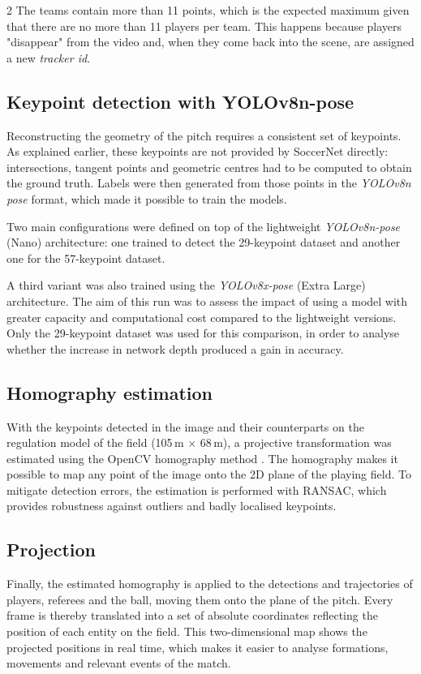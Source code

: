 \begin{multicols}{2}
The teams contain more than 11 points, which is the expected maximum given that there are no more than 11 players per team. This happens because players "disappear" from the video and, when they come back into the scene, are assigned a new \textit{tracker id}.

\subsection{Keypoint detection with YOLOv8n-pose}
Reconstructing the geometry of the pitch requires a consistent set of keypoints. As explained earlier, these keypoints are not provided by SoccerNet directly: intersections, tangent points and geometric centres had to be computed to obtain the ground truth. Labels were then generated from those points in the \emph{YOLOv8n pose} format, which made it possible to train the models.

Two main configurations were defined on top of the lightweight \emph{YOLOv8n-pose} (Nano) architecture: one trained to detect the 29-keypoint dataset and another one for the 57-keypoint dataset.

A third variant was also trained using the \emph{YOLOv8x-pose} (Extra Large) architecture. The aim of this run was to assess the impact of using a model with greater capacity and computational cost compared to the lightweight versions. Only the 29-keypoint dataset was used for this comparison, in order to analyse whether the increase in network depth produced a gain in accuracy.

\subsection{Homography estimation}
With the keypoints detected in the image and their counterparts on the regulation model of the field (105\,m $\times$ 68\,m), a projective transformation was estimated using the OpenCV homography method \cite{opencv}. The homography makes it possible to map any point of the image onto the 2D plane of the playing field. To mitigate detection errors, the estimation is performed with RANSAC, which provides robustness against outliers and badly localised keypoints.

\subsection{Projection}
Finally, the estimated homography is applied to the detections and trajectories of players, referees and the ball, moving them onto the plane of the pitch. Every frame is thereby translated into a set of absolute coordinates reflecting the position of each entity on the field. This two-dimensional map shows the projected positions in real time, which makes it easier to analyse formations, movements and relevant events of the match.

\end{multicols}
